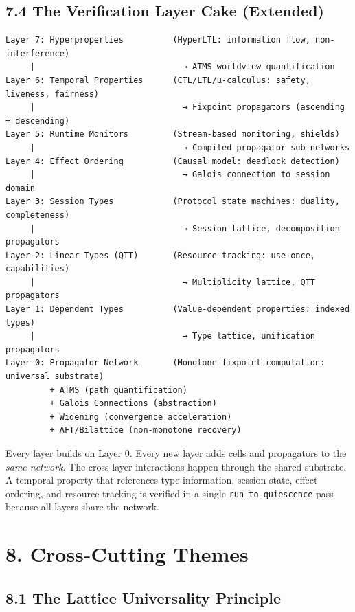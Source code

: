 \documentclass[11pt]{article}
\begin{document}
\subsection{7.4 The Verification Layer Cake (Extended)}
\label{sec:org30815ae}

\begin{verbatim}
Layer 7: Hyperproperties          (HyperLTL: information flow, non-interference)
     |                              → ATMS worldview quantification
Layer 6: Temporal Properties      (CTL/LTL/μ-calculus: safety, liveness, fairness)
     |                              → Fixpoint propagators (ascending + descending)
Layer 5: Runtime Monitors         (Stream-based monitoring, shields)
     |                              → Compiled propagator sub-networks
Layer 4: Effect Ordering          (Causal model: deadlock detection)
     |                              → Galois connection to session domain
Layer 3: Session Types            (Protocol state machines: duality, completeness)
     |                              → Session lattice, decomposition propagators
Layer 2: Linear Types (QTT)       (Resource tracking: use-once, capabilities)
     |                              → Multiplicity lattice, QTT propagators
Layer 1: Dependent Types          (Value-dependent properties: indexed types)
     |                              → Type lattice, unification propagators
Layer 0: Propagator Network       (Monotone fixpoint computation: universal substrate)
         + ATMS (path quantification)
         + Galois Connections (abstraction)
         + Widening (convergence acceleration)
         + AFT/Bilattice (non-monotone recovery)
\end{verbatim}

Every layer builds on Layer 0. Every new layer adds cells and propagators to
the \emph{same network}. The cross-layer interactions happen through the shared
substrate. A temporal property that references type information, session state,
effect ordering, and resource tracking is verified in a single
\texttt{run-to-quiescence} pass because all layers share the network.
\section{8. Cross-Cutting Themes}
\label{sec:org31d1549}

\subsection{8.1 The Lattice Universality Principle}
\label{sec:org39ba87f}
\end{document}
